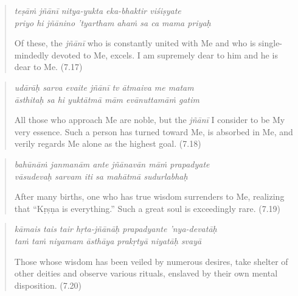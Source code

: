 \documentclass[12pt, twoside, openright]{memoir}
\begin{document}
\par
\begin{verse}
\textit{teṣāṁ jñānī nitya-yukta eka-bhaktir viśiṣyate} \\
\textit{priyo hi jñānino ’tyartham ahaṁ sa ca mama priyaḥ}

\noindent Of these, the \textit{jñānī} who is constantly united with Me and who is single-mindedly devoted to Me, excels. I am supremely dear to him and he is dear to Me. (7.17)
\end{verse}
\par



\par
\begin{verse}
\textit{udārāḥ sarva evaite jñānī tv ātmaiva me matam} \\
\textit{āsthitaḥ sa hi yuktātmā mām evānuttamāṁ gatim}

\noindent All those who approach Me are noble, but the \textit{jñānī} I consider to be My very essence. Such a person has turned toward Me, is absorbed in Me, and verily regards Me alone as the highest goal. (7.18)
\end{verse}
\par



\par
\begin{verse}
\textit{bahūnāṁ janmanām ante jñānavān māṁ prapadyate} \\
\textit{vāsudevaḥ sarvam iti sa mahātmā sudurlabhaḥ}

\noindent After many births, one who has true wisdom surrenders to Me, realizing that \enquote{Kṛṣṇa is everything.} Such a great soul is exceedingly rare. (7.19)
\end{verse}
\par



\par
\begin{verse}
\textit{kāmais tais tair hṛta-jñānāḥ prapadyante ’nya-devatāḥ} \\
\textit{taṁ taṁ niyamam āsthāya prakṛtyā niyatāḥ svayā}

\noindent Those whose wisdom has been veiled by numerous desires, take shelter of other deities and observe various rituals, enslaved by their own mental disposition. (7.20)
\end{verse}
\par
\end{document}
